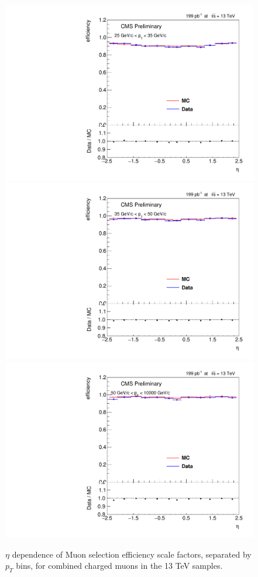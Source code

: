 \begin{figure}
\centering
\includegraphics[width=0.48\linewidth]{plots/efficiency/13_zmmsit_combined/PtBins_eta_pt0.pdf}
\includegraphics[width=0.48\linewidth]{plots/efficiency/13_zmmsit_combined/PtBins_eta_pt1.pdf}
\includegraphics[width=0.48\linewidth]{plots/efficiency/13_zmmsit_combined/PtBins_eta_pt2.pdf}
\caption{$\eta$ dependence of Muon selection efficiency scale factors, separated by $p_T$ bins, for combined charged muons in the 13 TeV samples.}
\label{fig:Eff:mu:13:SIT:com}
\end{figure}
